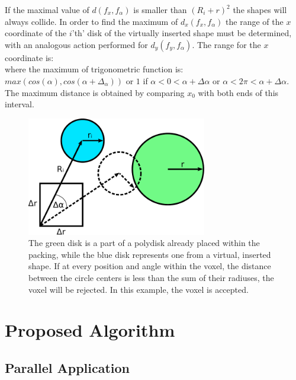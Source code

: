 \documentclass[12pt, oneside]{report}
\begin{document}
If the maximal value of $d(f_x,f_{\alpha})$ is smaller than $(R_i + r)^2$ the shapes will always collide. \newline
In order to find the maximum of $d_x(f_x,f_{\alpha})$ the range of the $x$ coordinate of the $i$'th' disk of the virtually inserted shape must be determined, with an analogous action performed for $d_y(f_y,f_{\alpha})$. The range for the $x$ coordinate is:
\begin{equation*}
[x + R_i \cdot \min_{f_{\alpha} \in [0,1)} cos(\alpha_i + f_{\alpha} \cdot \Delta \alpha), x + \Delta r + R_i \cdot \max_{f_{\alpha} \in [0,1)} cos(\alpha_i + f_{\alpha} \cdot \Delta \alpha)]
\end{equation*}
where the maximum of trigonometric function is: $max (cos(\alpha), cos(\alpha + \Delta_{\alpha})) $ or
$1$ if $ \alpha<0<\alpha + \Delta \alpha $ or $ \alpha< 2 \pi <\alpha + \Delta \alpha$.
The maximum distance is obtained by comparing $x_0$ with both ends of this interval. \newline


\begin{figure}[H]
  \centering
	\includegraphics[width=0.7\textwidth,keepaspectratio]{Images/CieslaAlgorithm/drawing.pdf}
	\caption{The green disk is a part of a polydisk already placed within the packing, while the blue disk represents one from a virtual, inserted shape. If at every position and angle within the voxel, the distance between the circle centers is less than the sum of their radiuses, the voxel will be rejected. In this example, the voxel is accepted.}
	\label{CieslaAlgorithmDemo}
\end{figure}

\chapter{Proposed Algorithm}

\section {Parallel Application}
\end{document}
